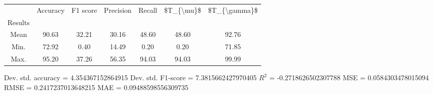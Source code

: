 \begin{tabular}{|c|c|c|c|c|c|c|}
\toprule
{} &  Accuracy &  F1 score &  Precision &  Recall &  \$T\_\{\textbackslash mu\}\$ &  \$T\_\{\textbackslash gamma\}\$ \\
Results &           &           &            &         &            &               \\
\hline
Mean    &     90.63 &     32.21 &      30.16 &   48.60 &      48.60 &         92.76 \\
Min.    &     72.92 &      0.40 &      14.49 &    0.20 &       0.20 &         71.85 \\
Max.    &     95.20 &     37.26 &      56.35 &   94.03 &      94.03 &         99.99 \\
\bottomrule
\end{tabular}

 Dev. std. accuracy = 4.354367152864915
 Dev. std. F1-score = 7.3815662427970405
 $R^2$ = -0.2718626502307788
 MSE = 0.0584303478015094
 RMSE = 0.2417237013648215
 MAE = 0.09488598556309735